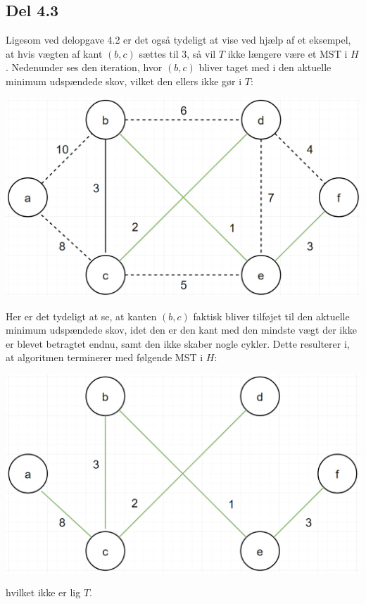 \documentclass{report}
\begin{document}
\subsection*{Del 4.3}
Ligesom ved delopgave 4.2 er det også tydeligt at vise ved hjælp af et eksempel, at hvis vægten af kant $(b, c)$ sættes til 3, så vil $T$ ikke længere være et MST i $H$. Nedenunder ses den iteration, hvor  $(b, c)$ bliver taget med i den aktuelle minimum udspændede skov, vilket den ellers ikke gør i $T$:
\begin{center}
    \includegraphics[height = 5 cm]{../entities/new_new_kruskal1}
\end{center}
Her er det tydeligt at se, at kanten $(b, c)$ faktisk bliver tilføjet til den aktuelle minimum udspændede skov, idet den er den kant med den mindste vægt der ikke er blevet betragtet endnu, samt den ikke skaber nogle cykler. Dette resulterer i, at algoritmen terminerer med følgende MST i $H$:
\begin{center}
    \includegraphics[height = 5 cm]{../entities/new_new_kruskal2}
\end{center}
hvilket ikke er lig $T$.

\newpage
\end{document}

